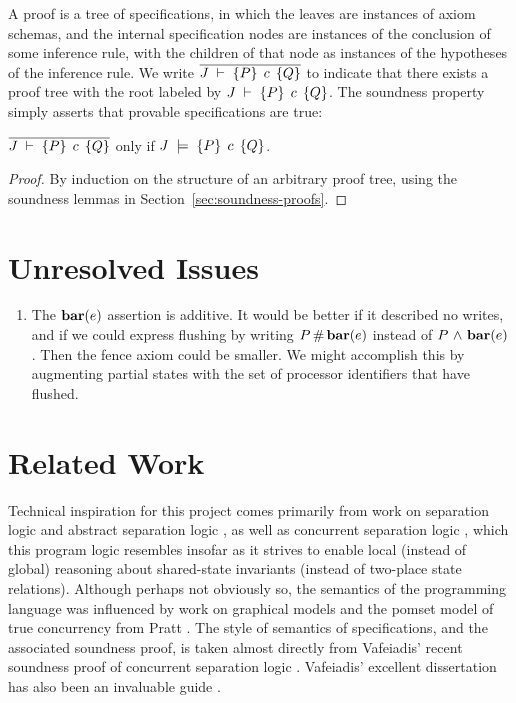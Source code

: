 \documentclass[11pt]{article}
\begin{document}
A proof is a tree of specifications, in which the leaves are instances of axiom schemas, and the internal specification nodes are instances of the conclusion of some inference rule, with the children of that node as instances of the hypotheses of the inference rule. We write $\overline{J\;\vdash\;\left\lbrace P \right\rbrace\;c\;\left\lbrace Q \right\rbrace}$ to indicate that there exists a proof tree with the root labeled by $J\;\vdash\;\left\lbrace P \right\rbrace\;c\;\left\lbrace Q \right\rbrace$. The soundness property simply asserts that provable specifications are true: 

\begin{theorem}[Soundness]
	$\overline{J\;\vdash\;\left\lbrace P \right\rbrace\;c\;\left\lbrace Q \right\rbrace}$ only if $J\;\models\;\left\lbrace P \right\rbrace\;c\;\left\lbrace Q \right\rbrace$. 
\end{theorem}

\begin{proof}
	By induction on the structure of an arbitrary proof tree, using the soundness lemmas in Section~\ref{sec:soundness-proofs}. 
\end{proof}

\section{Unresolved Issues}

\begin{enumerate}
	\item The $\mathbf{bar}(e)$ assertion is additive. It would be better if it described no writes, and if we could express flushing by writing $P \operatorname{\#} \mathbf{bar}(e)$ instead of $P \operatorname{\,\wedge\,} \mathbf{bar}(e)$. Then the fence axiom could be smaller. We might accomplish this by augmenting partial states with the set of processor identifiers that have flushed.  
\end{enumerate}


\section{Related Work}

Technical inspiration for this project comes primarily from work on separation logic \cite{DBLP:conf/lics/Reynolds02,DBLP:conf/csl/OHearnRY01,DBLP:journals/bsl/OHearnP99} and abstract separation logic \cite{DBLP:conf/lics/CalcagnoOY07}, as well as concurrent separation logic  \cite{DBLP:journals/tcs/OHearn07,DBLP:journals/tcs/Brookes07}, which this program logic resembles insofar as it strives to enable local (instead of global) reasoning about shared-state invariants (instead of two-place state relations). Although perhaps not obviously so, the semantics of the programming language was influenced by work on graphical models \cite{DBLP:journals/ipl/WehrmanHO09,DBLP:conf/RelMiCS/HoareMSW09,DBLP:journals/jlp/HoareMSW11} and the pomset model of true concurrency from Pratt \cite{DBLP:conf/popl/Pratt82,DBLP:conf/concur/Pratt84}. The style of semantics of specifications, and the associated soundness proof, is taken almost directly from Vafeiadis' recent soundness proof of concurrent separation logic \cite{V11}. Vafeiadis' excellent dissertation has also been an invaluable guide \cite{VafeiadisDissertation}. 
\end{document}
